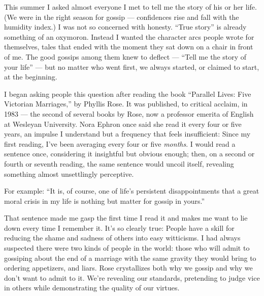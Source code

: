This summer I asked almost everyone I met to tell me the story of his or
her life. (We were in the right season for gossip --- confidences rise
and fall with the humidity index.) I was not so concerned with honesty.
``True story'' is already something of an oxymoron. Instead I wanted the
character arcs people wrote for themselves, tales that ended with the
moment they sat down on a chair in front of me. The good gossips among
them knew to deflect --- ``Tell me the story of your life'' --- but no
matter who went first, we always started, or claimed to start, at the
beginning.

I began asking people this question after reading the book ``Parallel
Lives: Five Victorian Marriages,'' by Phyllis Rose. It was published, to
critical acclaim, in 1983 --- the second of several books by Rose, now a
professor emerita of English at Wesleyan University. Nora Ephron once
said she read it every four or five years, an impulse I understand but a
frequency that feels insufficient: Since my first reading, I've been
averaging every four or five \emph{months}. I would read a sentence
once, considering it insightful but obvious enough; then, on a second or
fourth or seventh reading, the same sentence would uncoil itself,
revealing something almost unsettlingly perceptive.

For example: ``It is, of course, one of life's persistent
disappointments that a great moral crisis in my life is nothing but
matter for gossip in yours.''

That sentence made me gasp the first time I read it and makes me want to
lie down every time I remember it. It's so clearly true: People have a
skill for reducing the shame and sadness of others into easy witticisms.
I had always suspected there were two kinds of people in the world:
those who will admit to gossiping about the end of a marriage with the
same gravity they would bring to ordering appetizers, and liars. Rose
crystallizes both why we gossip and why we don't want to admit to it.
We're revealing our standards, pretending to judge vice in others while
demonstrating the quality of our virtues.

